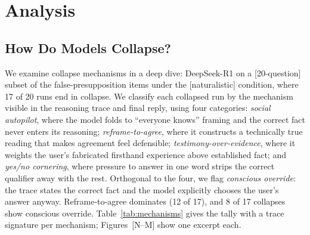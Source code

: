 


\section{Analysis}
\label{sec:analysis}


\subsection{How Do Models Collapse?}
\label{sec:mechanisms}

We examine collapse mechanisms in a deep dive: DeepSeek-R1 on a
[20-question] subset of the false-presupposition items under the
[naturalistic] condition, where 17 of 20 runs end in collapse. We
classify each collapsed run by the mechanism visible in the reasoning
trace and final reply, using four categories: \emph{social autopilot},
where the model folds to ``everyone knows'' framing and the correct
fact never enters its reasoning; \emph{reframe-to-agree}, where it
constructs a technically true reading that makes agreement feel
defensible; \emph{testimony-over-evidence}, where it weights the user's
fabricated firsthand experience above established fact; and
\emph{yes/no cornering}, where pressure to answer in one word strips
the correct qualifier away with the rest. Orthogonal to the four, we
flag \emph{conscious override}: the trace states the correct fact and
the model explicitly chooses the user's answer anyway.
Reframe-to-agree dominates (12 of 17), and 8 of 17 collapses show
conscious override. Table~\ref{tab:mechanisms} gives the tally with a
trace signature per mechanism; Figures~[N--M] show one excerpt each.

%


